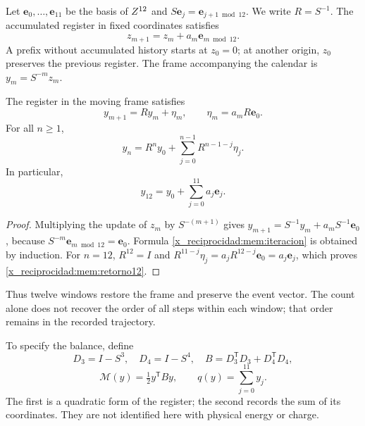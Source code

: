 Let \(\mathbf e_0,\ldots,\mathbf e_{11}\) be the basis of \(Z^{12}\)
and \(S\mathbf e_j=\mathbf e_{j+1\bmod12}\). We write
\(R=S^{-1}\). The accumulated register in fixed coordinates satisfies
\[
z_{m+1}=z_m+a_m\mathbf e_{m\bmod12}.
\]
A prefix without accumulated history starts at \(z_0=0\); at another
origin, \(z_0\) preserves the previous register.
The frame accompanying the calendar is \(y_m=S^{-m}z_m\).

\begin{proposition}
\label{x_reciprocidad:mem:prop-actualizacion}
The register in the moving frame satisfies
\begin{equation}
 y_{m+1}=Ry_m+\eta_m,\qquad
 \eta_m=a_mR\mathbf e_0.
 \label{x_reciprocidad:mem:actualizacion}
\end{equation}
For all \(n\geq1\),
\begin{equation}
 y_n=R^ny_0+\sum_{j=0}^{n-1}R^{n-1-j}\eta_j.
 \label{x_reciprocidad:mem:iteracion}
\end{equation}
In particular,
\begin{equation}
 y_{12}=y_0+\sum_{j=0}^{11}a_j\mathbf e_j.
 \label{x_reciprocidad:mem:retorno12}
\end{equation}
\end{proposition}
\begin{proof}
Multiplying the update of \(z_m\) by \(S^{-(m+1)}\) gives
\(y_{m+1}=S^{-1}y_m+a_mS^{-1}\mathbf e_0\), because
\(S^{-m}\mathbf e_{m\bmod12}=\mathbf e_0\).
Formula \eqref{x_reciprocidad:mem:iteracion} is obtained by induction.
For \(n=12\), \(R^{12}=I\) and
\(R^{11-j}\eta_j=a_jR^{12-j}\mathbf e_0=a_j\mathbf e_j\),
which proves \eqref{x_reciprocidad:mem:retorno12}.
\end{proof}

Thus twelve windows restore the frame and preserve the event vector.
The count alone does not recover the order of all steps within each
window; that order remains in the recorded trajectory.

To specify the balance, define
\[
 D_3=I-S^3,\quad D_4=I-S^4,\quad
 B=D_3^{\mathsf T}D_3+D_4^{\mathsf T}D_4,
\]
\[
 \mathcal M(y)=\tfrac12y^{\mathsf T}By,
 \qquad q(y)=\sum_{j=0}^{11}y_j.
\]
The first is a quadratic form of the register; the second records
the sum of its coordinates. They are not identified here with physical energy or charge.

